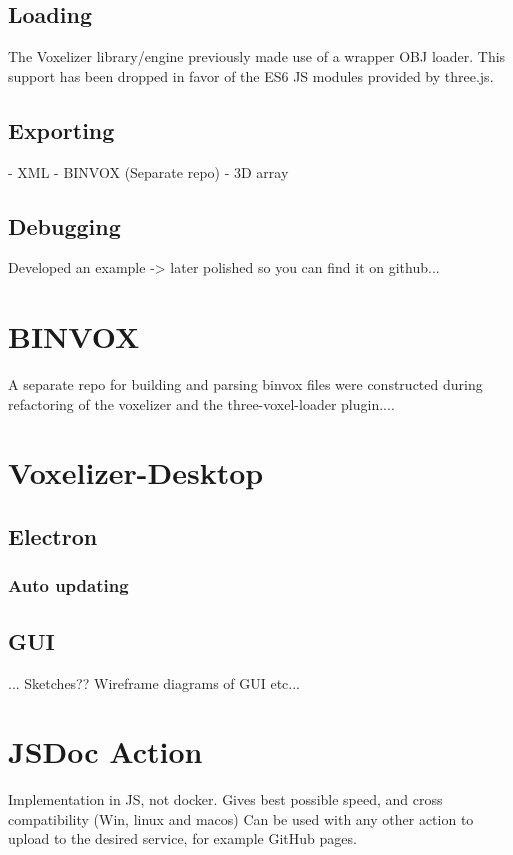\subsection{Loading}
The Voxelizer library/engine previously made use of a wrapper OBJ loader.
This support has been dropped in favor of the ES6 JS modules provided by three.js.

\subsection{Exporting}
- XML
- BINVOX (Separate repo)
- 3D array

\subsection{Debugging}
Developed an example -> later polished so you can find it on github...

\section{BINVOX}
A separate repo for building and parsing binvox files were constructed during refactoring of the voxelizer and the three-voxel-loader plugin....



\section{Voxelizer-Desktop}
\subsection{Electron}
\subsubsection{Auto updating}

\subsection{GUI}
... Sketches?? Wireframe diagrams of GUI etc...


\section{JSDoc Action}
Implementation in JS, not docker. Gives best possible speed, and cross compatibility (Win, linux and macos)
Can be used with any other action to upload to the desired service, for example GitHub pages.


